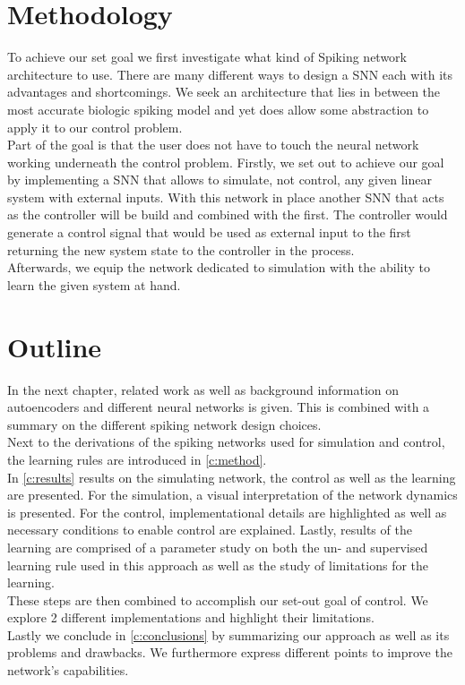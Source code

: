 \section{Methodology}
To achieve our set goal we first investigate what kind of Spiking network architecture to use. There are many different ways to design a \ac{SNN} each with its advantages and shortcomings.
We seek an architecture that lies in between the most accurate biologic spiking model and yet does allow some abstraction to apply it to our control problem.\\
Part of the goal is that the user does not have to touch the neural network working underneath the control problem.
Firstly, we set out to achieve our goal by implementing a \ac{SNN} that allows to simulate, not control, any given linear system with external inputs. With this network in place another \ac{SNN} that acts as the controller will be build and combined with the first. The controller would generate a control signal that would be used as external input to the first returning the new system state to the controller in the process.\\
Afterwards, we equip the network dedicated to simulation with the ability to learn the given system at hand.\\


\section{Outline}
In the next chapter, related work as well as background information on autoencoders and different neural networks is given. This is combined with a summary on the different spiking network design choices.\\
Next to the derivations of the spiking networks used for simulation and control, the learning rules are introduced in \cref{c:method}.\\
In \cref{c:results} results on the simulating network, the control as well as the learning are presented. For the simulation, a visual interpretation of the network dynamics is presented. For the control, implementational details are highlighted as well as necessary conditions to enable control are explained.
Lastly, results of the learning are comprised of a parameter study on both the un- and supervised learning rule used in this approach as well as the study of limitations for the learning.\\
These steps are then combined to accomplish our set-out goal of control. We explore 2 different implementations and highlight their limitations.\\
Lastly we conclude in \cref{c:conclusions} by summarizing our approach as well as its problems and drawbacks. We furthermore express different points to improve the network's capabilities.
